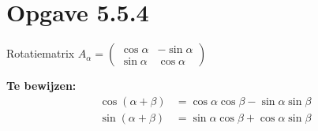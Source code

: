 \documentclass{article}
\begin{document}
\section*{Opgave 5.5.4}

Rotatiematrix $A_{\alpha} = \begin{pmatrix} \cos \alpha & -\sin \alpha \\ \sin \alpha & \cos \alpha \end{pmatrix}$

\textbf{Te bewijzen:}
\begin{align*}
    \cos(\alpha + \beta) & = \cos \alpha \cos \beta - \sin \alpha \sin \beta \\
    \sin(\alpha + \beta) & = \sin \alpha \cos \beta + \cos \alpha \sin \beta
\end{align*}
\end{document}
